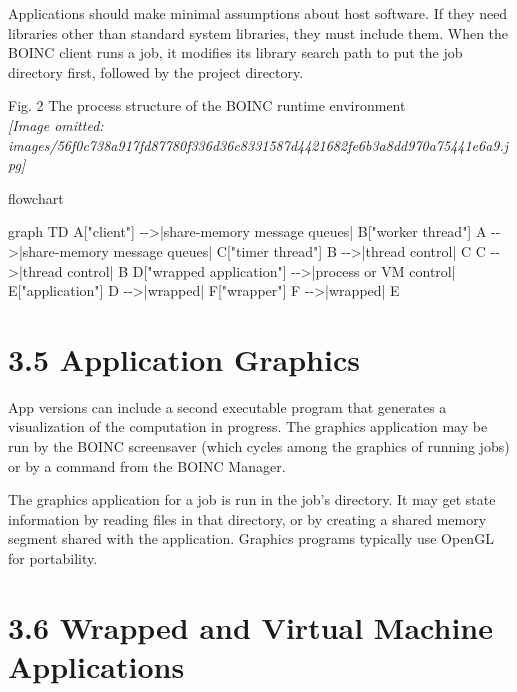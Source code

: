 \documentclass[
]{article}
\newenvironment{Shaded}{}{}
\newcommand{\NormalTok}[1]{#1}
\begin{document}
Applications should make minimal assumptions about host software. If
they need libraries other than standard system libraries, they must
include them. When the BOINC client runs a job, it modifies its library
search path to put the job directory first, followed by the project
directory.

Fig. 2 The process structure of the BOINC runtime environment\\
\textit{[Image omitted: images/56f0c738a917fd87780f336d36c8331587d4421682fe6b3a8dd970a75441e6a9.jpg]}

flowchart

\begin{Shaded}
\begin{Highlighting}[]
\NormalTok{graph TD}
\NormalTok{    A["client"] {-}{-}\textgreater{}|share{-}memory message queues| B["worker thread"]}
\NormalTok{    A {-}{-}\textgreater{}|share{-}memory message queues| C["timer thread"]}
\NormalTok{    B {-}{-}\textgreater{}|thread control| C}
\NormalTok{    C {-}{-}\textgreater{}|thread control| B}
\NormalTok{    D["wrapped application"] {-}{-}\textgreater{}|process or VM control| E["application"]}
\NormalTok{    D {-}{-}\textgreater{}|wrapped| F["wrapper"]}
\NormalTok{    F {-}{-}\textgreater{}|wrapped| E}
\end{Highlighting}
\end{Shaded}

\section{3.5 Application Graphics}\label{application-graphics}

App versions can include a second executable program that generates a
visualization of the computation in progress. The graphics application
may be run by the BOINC screensaver (which cycles among the graphics of
running jobs) or by a command from the BOINC Manager.

The graphics application for a job is run in the job's directory. It may
get state information by reading files in that directory, or by creating
a shared memory segment shared with the application. Graphics programs
typically use OpenGL for portability.

\section{3.6 Wrapped and Virtual Machine
Applications}\label{wrapped-and-virtual-machine-applications}
\end{document}
